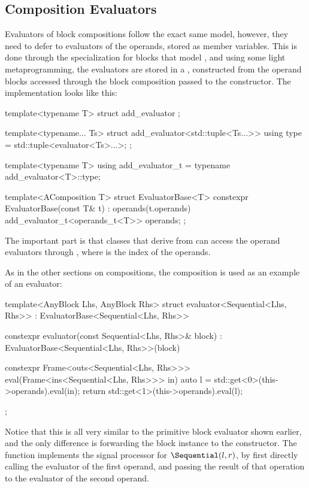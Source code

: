 \subsection{Composition Evaluators}

Evaluators of block compositions follow the exact same model, however, they need to defer to evaluators of
the operands, stored as member variables. This is done through the  specialization for
blocks that model , and using some light metaprogramming, the evaluators are stored in
a , constructed from the operand blocks accessed through the block composition passed
to the constructor. The implementation looks like this:

\begin{cppcodenl}
  template<typename T>
  struct add_evaluator {};
    
  template<typename... Ts>
  struct add_evaluator<std::tuple<Ts...>> {
    using type = std::tuple<evaluator<Ts>...>;
  };
  
  template<typename T>
  using add_evaluator_t = typename add_evaluator<T>::type;

  template<AComposition T>
  struct EvaluatorBase<T> {
    constexpr EvaluatorBase(const T& t) : operands(t.operands) {}
    add_evaluator_t<operands_t<T>> operands;
  };
\end{cppcodenl}

The important part is that classes that derive from  can access the operand evaluators
through , where  is the index of the operands.

As in the other sections on compositions, the \Sequential composition is used as an example of an evaluator:

\begin{cppcodenl}
  template<AnyBlock Lhs, AnyBlock Rhs>
  struct evaluator<Sequential<Lhs, Rhs>> : EvaluatorBase<Sequential<Lhs, Rhs>> {
    constexpr evaluator(const Sequential<Lhs, Rhs>& block) : EvaluatorBase<Sequential<Lhs, Rhs>>(block) {}

    constexpr Frame<outs<Sequential<Lhs, Rhs>>> eval(Frame<ins<Sequential<Lhs, Rhs>>> in)
    {
      auto l = std::get<0>(this->operands).eval(in);
      return std::get<1>(this->operands).eval(l);
    }
  };
\end{cppcodenl}

Notice that this is all very similar to the primitive block evaluator shown earlier, and the only difference
is forwarding the block instance to the  constructor.  The  function implements the signal processor
for $\Sequential(l, r)$, by first directly calling the evaluator of the first operand, and passing the
result of that operation to the evaluator of the second operand.

